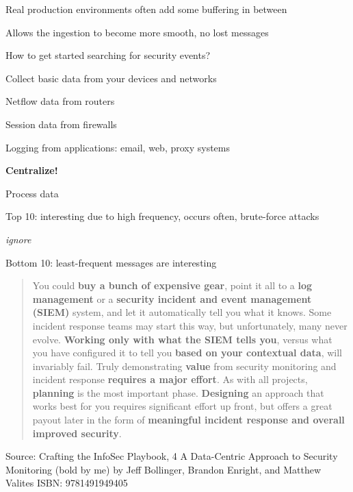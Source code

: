 \documentclass[Screen16to9,17pt]{foils}
\begin{document}

\begin{list2}
\item Real production environments often add some buffering in between
\item Allows the ingestion to become more smooth, no lost messages
\end{list2}




\begin{list1}
\item How to get started searching for security events?
\item Collect basic data from your devices and networks
\begin{list2}
\item Netflow data from routers
\item Session data from firewalls
\item Logging from applications: email, web, proxy systems
\end{list2}
\item {\bf Centralize!}
\item Process data
\begin{list2}
\item Top 10: interesting due to high frequency, occurs often, brute-force attacks
\item {\it ignore}
\item Bottom 10: least-frequent messages are interesting
\end{list2}
\end{list1}





\begin{quote}\small
You could {\bf buy a bunch of expensive gear}, point it all to a {\bf log management} or a {\bf security incident and event management (SIEM)} system, and let it automatically tell you what it knows. Some incident response teams may start this way, but unfortunately, many never evolve. {\bf Working only with what the SIEM tells you}, versus what you have configured it to tell you {\bf based on your contextual data}, will invariably fail. Truly demonstrating {\bf value} from security monitoring and incident response {\bf requires a major effort}. As with all projects, {\bf planning} is the most important phase. {\bf Designing} an approach that works best for you requires significant effort up front, but offers a great payout later in the form of {\bf meaningful incident response and overall improved security}.
\end{quote}
Source: Crafting the InfoSec Playbook, 4 A Data-Centric Approach to Security Monitoring (bold by me)
by Jeff Bollinger, Brandon Enright, and Matthew Valites ISBN: 9781491949405
\end{document}
